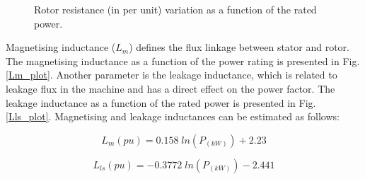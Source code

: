 \documentclass[twocolumn]{article}
\begin{document}
\begin{figure}[]
  \centering

    \caption{Rotor resistance (in per unit) variation as a function of the rated power.} 
    \label{Rs}
\end{figure}

Magnetising inductance ($L_m$) defines the flux linkage between stator and rotor. The magnetising inductance as a function of the power rating is presented in Fig. \ref{Lm_plot}. Another parameter is the leakage inductance, which is related to leakage flux in the machine and has a direct effect on the power factor. The leakage inductance as a function of the rated power is presented in Fig. \ref{Lls_plot}. Magnetising and leakage inductances can be estimated as follows:

\begin{equation}
 	L_m (pu) = 0.158\;ln (P_{(kW)}) + 2.23
 	\label{eq:Lm}
 \end{equation} 

\begin{equation}
 	L_{ls}(pu) = -0.3772 \;ln (P_{(kW)}) - 2.441
 	\label{eq:Lls}
 \end{equation} 
\end{document}
